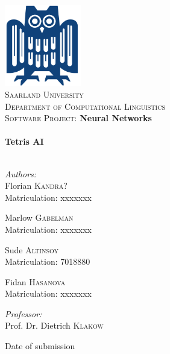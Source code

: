 \begin{titlepage}
\begin{center}

\includegraphics[width=0.25\textwidth]{./eule}~\\[1cm]

\textsc{\LARGE Saarland  University}\\[0.4cm]
\textsc{\Large Department of Computational Linguistics}\\[1.5cm]

\textsc{\Large Software Project:} \textbf{\Large Neural Networks}\\[0.5cm]

\HRule \\[1.0cm]

{ \huge \bfseries Tetris AI}\\[0.4cm]

\HRule \\[1.5cm]

\begin{minipage}{0.4\textwidth}
\begin{flushleft} \large
\emph{Authors:}\\
Florian \textsc{Kandra?}\\
Matriculation: xxxxxxx \newline

Marlow \textsc{Gabelman}\\
Matriculation: xxxxxxx \newline

Sude \textsc{Altinsoy}\\
Matriculation: 7018880 \newline

Fidan \textsc{Hasanova}\\
Matriculation: xxxxxxx
\end{flushleft}
\end{minipage}
\begin{minipage}{0.4\textwidth}
\begin{flushright} \large
\emph{Professor:} \\
Prof. Dr. Dietrich \textsc{Klakow}\\
\end{flushright}
\end{minipage}

\vfill

{\large Date of submission}

\end{center}
\end{titlepage}
